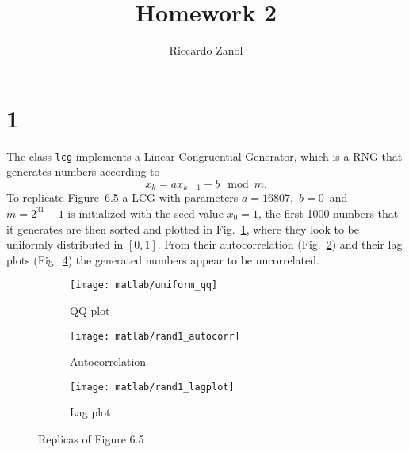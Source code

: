 \documentclass[a4paper,oneside]{article}
\author{Riccardo Zanol}
\title{Homework 2}
\newcommand{\inlinecode}[1]{\lstinline[basicstyle=\ttfamily,keywordstyle={},stringstyle={},commentstyle={\itshape}]{#1}}
\begin{document}
\maketitle
\section*{1}
The class \inlinecode{lcg} implements a Linear Congruential Generator,
which is a RNG that generates numbers according to
\[ x_{k} = ax_{k-1} +b \mod m . \]
To replicate Figure~6.5 a LCG with parameters
$a=16807$,~$b=0$~and~$m=2^{31}-1$ is initialized with the seed value
$x_0 = 1$, the first 1000 numbers that it generates are then sorted
and plotted in Fig.~\ref{plot:qqplot}, where they look to be uniformly
distributed in $[0,1]$.  From their autocorrelation
(Fig.~\ref{plot:autocorr}) and their lag plots
(Fig.~\ref{plot:lagplot}) the generated numbers appear to be
uncorrelated.
\begin{figure}[htbp]
  \centering
  \begin{subfigure}{0.5\textwidth}
    \centering
    \texttt{[image: matlab/uniform\_qq]}
    \caption{QQ plot}
    \label{plot:qqplot}
  \end{subfigure}%
  \begin{subfigure}{0.5\textwidth}
        \centering
    \texttt{[image: matlab/rand1\_autocorr]}
    \caption{Autocorrelation}
    \label{plot:autocorr}
  \end{subfigure}
  \begin{subfigure}{0.5\textwidth}
        \centering
    \texttt{[image: matlab/rand1\_lagplot]}
    \caption{Lag plot}
    \label{plot:lagplot}
  \end{subfigure}
  \caption{Replicas of Figure 6.5}
\end{figure}
\end{document}
